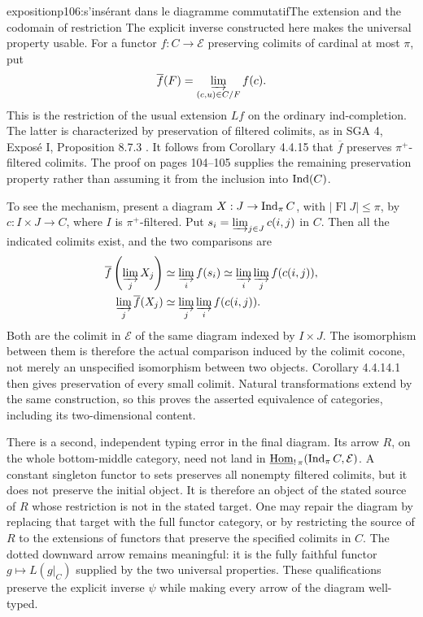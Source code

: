 \begin{dcomment}{exposition}{p106:s'insérant dans le diagramme commutatif}{The extension and the codomain of restriction}
The explicit inverse constructed here makes the universal property usable. For a functor $f:C\to\mathcal E$ preserving colimits of cardinal at most $\pi$, put
\[
\overline f(F)=\varinjlim_{(c,u)\in C/F}f(c).
\]
This is the restriction of the usual extension $Lf$ on the ordinary ind-completion. The latter is characterized by preservation of filtered colimits, as in SGA 4, Expos\'e I, Proposition 8.7.3 \citep{SGA4I1972}. It follows from Corollary 4.4.15 that $\overline f$ preserves $\pi^+$-filtered colimits. The proof on pages 104--105 supplies the remaining preservation property rather than assuming it from the inclusion into $\operatorname{Ind}(C)$.

To see the mechanism, present a diagram $X:J\to\operatorname{Ind}_\pi C$, with $|\operatorname{Fl}J|\leq\pi$, by $c:I\times J\to C$, where $I$ is $\pi^+$-filtered. Put $s_i=\varinjlim_{j\in J}c(i,j)$ in $C$. Then all the indicated colimits exist, and the two comparisons are
\[
\begin{aligned}
\overline f\left(\varinjlim_jX_j\right)
&\simeq\varinjlim_i f(s_i)
\simeq\varinjlim_i\varinjlim_j f(c(i,j)),\\
\varinjlim_j\overline f(X_j)
&\simeq\varinjlim_j\varinjlim_i f(c(i,j)).
\end{aligned}
\]
Both are the colimit in $\mathcal E$ of the same diagram indexed by $I\times J$. The isomorphism between them is therefore the actual comparison induced by the colimit cocone, not merely an unspecified isomorphism between two objects. Corollary 4.4.14.1 then gives preservation of every small colimit. Natural transformations extend by the same construction, so this proves the asserted equivalence of categories, including its two-dimensional content.

There is a second, independent typing error in the final diagram. Its arrow $R$, on the whole bottom-middle category, need not land in $\underline{\mathrm{Hom}}_{!\,\pi}(\operatorname{Ind}_\pi C,\mathcal E)$. A constant singleton functor to sets preserves all nonempty filtered colimits, but it does not preserve the initial object. It is therefore an object of the stated source of $R$ whose restriction is not in the stated target. One may repair the diagram by replacing that target with the full functor category, or by restricting the source of $R$ to the extensions of functors that preserve the specified colimits in $C$. The dotted downward arrow remains meaningful: it is the fully faithful functor $g\mapsto L(g|_C)$ supplied by the two universal properties. These qualifications preserve the explicit inverse $\psi$ while making every arrow of the diagram well-typed.
\end{dcomment}


